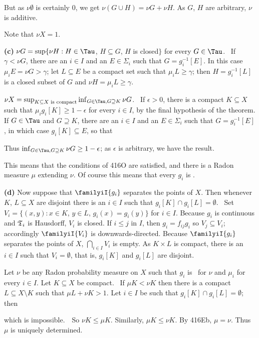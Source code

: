 {\noindent But as $\nu\emptyset$ is certainly $0$, we get
$\nu(G\cup H)=\nu G+\nu H$.   As $G$, $H$ are arbitrary, $\nu$ is
additive.\ \Qed

Note that $\nu X=1$.

\medskip

{\bf (c)} $\nu G=\sup\{\nu H:H\in\Tau$, $H\subseteq G$, $H$ is closed$\}$
for every $G\in\Tau$.   \Prf\ If
$\gamma<\nu G$, there are an $i\in I$ and an $E\in\Sigma_i$ such that
$G=g_i^{-1}[E]$.
In this case $\mu_iE=\nu G>\gamma$;  let $L\subseteq E$ be a compact set
such that
$\mu_iL\ge\gamma$;  then $H=g_i^{-1}[L]$ is a closed subset of $G$ and
$\nu H=\mu_iL\ge\gamma$.\ \Qed

$\nu X=\sup_{K\subseteq X\text{ is compact}}
  \inf_{G\in\Tau,G\supseteq K}\nu G$.   \Prf\
If $\epsilon>0$, there is a compact $K\subseteq X$ such that
$\mu_ig_i[K]\ge 1-\epsilon$
for every $i\in I$, by the final hypothesis of the theorem.   If
$G\in\Tau$ and $G\supseteq K$,
there are an $i\in I$ and an $E\in\Sigma_i$ such that $G=g_i^{-1}[E]$,
in which case
$g_i[K]\subseteq E$, so that


\noindent Thus $\inf_{G\in\Tau,G\supseteq K}\nu G\ge 1-\epsilon$;  as
$\epsilon$ is arbitrary,
we have the result.\ \Qed

This means that the conditions of 416O are satisfied, and there is a
Radon measure $\mu$
extending $\nu$.   Of course this means that every $g_i$ is \imp.

\medskip

{\bf (d)} Now suppose that $\familyiI{g_i}$ separates the points of $X$.
Then whenever $K$, $L\subseteq X$ are disjoint there is an $i\in I$ such
that $g_i[K]\cap g_i[L]=\emptyset$.   \Prf\ Set
$V_i=\{(x,y):x\in K$, $y\in L$, $g_i(x)=g_i(y)\}$ for $i\in I$.
Because $g_i$ is continuous and $\frak T_i$ is Hausdorff, $V_i$ is closed.
If $i\le j$ in $I$, then $g_i=f_{ij}g_i$ so $V_j\subseteq V_i$;
accordingly $\familyiI{V_i}$ is downwards-directed.   Because
$\familyiI{g_i}$ separates the points of $X$, $\bigcap_{i\in I}V_i$ is
empty.   As $K\times L$ is compact, there is an $i\in I$ such that
$V_i=\emptyset$, that is, $g_i[K]$ and $g_i[L]$ are disjoint.\ \Qed

Let $\nu$ be any Radon probability
measure on $X$ such that $g_i$ is \imp\ for $\nu$ and $\mu_i$ for
every $i\in I$.   Let $K\subseteq X$ be compact.   \Quer\ If $\mu K<\nu K$
then there is a compact $L\subseteq X\setminus K$ such that
$\mu L+\nu K>1$.   Let $i\in I$ be such that $g_i[K]\cap g_i[L]=\emptyset$;
then


\noindent which is impossible.\ \BanG\   So $\nu K\le\mu K$.   Similarly,
$\mu K\le\nu K$.   By 416Eb, $\mu=\nu$.
Thus $\mu$ is uniquely determined.
}%


